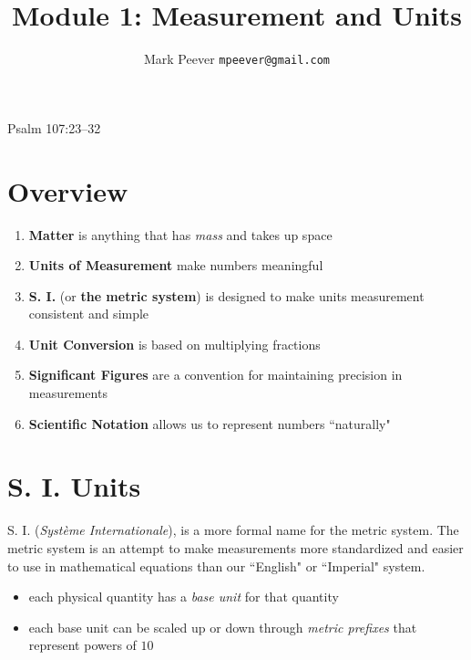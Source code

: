 \documentclass[11pt, oneside]{article}   	%
\title{Module 1: Measurement and Units}
\author{Mark Peever \texttt{mpeever@gmail.com}}
\begin{document}
\maketitle

\begin{center}
Psalm 107:23--32
\end{center}

\section{Overview}

\begin{enumerate}
\item \textbf{Matter} is anything that has \emph{mass} and takes up space
\item \textbf{Units of Measurement} make numbers meaningful
\item \textbf{S. I.} (or \textbf{the metric system}) is designed to make units measurement consistent and simple
\item \textbf{Unit Conversion} is based on multiplying fractions
\item \textbf{Significant Figures} are a convention for maintaining precision in measurements
\item \textbf{Scientific Notation} allows us to represent numbers ``naturally"   
\end{enumerate}

\section{S. I. Units}
S. I. (\emph{Syst\`eme Internationale}), is a more formal name for the metric system. The metric system is an attempt to make measurements more standardized and easier to use in mathematical equations than our ``English" or ``Imperial" system.

\begin{itemize}
\item each physical quantity has a \emph{base unit} for that quantity \cite[p. 5]{wile-chem-2}
\item each base unit can be scaled up or down through \emph{metric prefixes} that represent powers of $10$ \cite[p. 7]{wile-chem-2}
\end{itemize}
\end{document}
